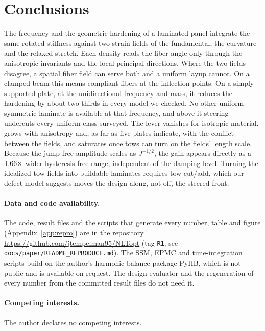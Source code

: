 \section{Conclusions}\label{sec:conclusions}
The frequency and the geometric hardening of a laminated panel integrate the same rotated stiffness
against two strain fields of the fundamental, the curvature and the relaxed stretch. Each density
reads the fiber angle only through the anisotropic invariants and the local principal directions.
Where the two fields disagree, a spatial fiber field can serve both and a uniform layup cannot. On a
clamped beam this means compliant fibers at the inflection points. On a simply supported plate, at the
unidirectional frequency and mass, it reduces the hardening by about two thirds in every model we
checked. No other uniform symmetric laminate is available at that frequency, and above it steering undercuts every
uniform class surveyed. The lever vanishes for isotropic material, grows with anisotropy and, as far as five plates indicate, with the
conflict between the fields, and saturates once tows can turn on the fields' length scale. Because the
jump-free amplitude scales as $J^{-1/2}$, the gain appears directly as a $1.66\times$ wider
hysteresis-free range, independent of the damping level. Turning the idealized tow fields into buildable
laminates requires tow cut/add, which our defect model suggests moves the design along, not off, the
steered front.

\paragraph{Data and code availability.} The code, result files and the scripts that generate
every number, table and figure (Appendix~\ref{app:repro}) are in the repository
\url{https://github.com/jtempelman95/NLTopt} (tag \texttt{R1}; see \texttt{docs/paper/README\_REPRODUCE.md}).
The SSM, EPMC and time-integration scripts build on the author's harmonic-balance package PyHB,
which is not public and is available on request. The design evaluator and the regeneration of every
number from the committed result files do not need it.

\paragraph{Competing interests.} The author declares no competing interests.
